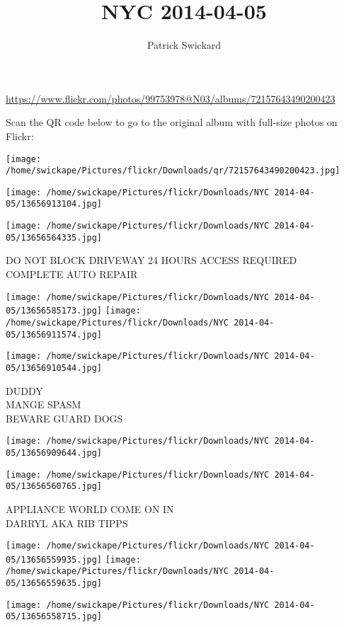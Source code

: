 \documentclass[10pt,letterpaper]{article}
\title{NYC 2014-04-05}
\author{Patrick Swickard}
\date{}
\begin{document}
\maketitle

\url{https://www.flickr.com/photos/99753978@N03/albums/72157643490200423}

Scan the QR code below to go to the original album with full-size photos on Flickr:

\texttt{[image: /home/swickape/Pictures/flickr/Downloads/qr/72157643490200423.jpg]}
\pagebreak

\texttt{[image: /home/swickape/Pictures/flickr/Downloads/NYC 2014-04-05/13656913104.jpg]}

\vspace{0.25in}
\texttt{[image: /home/swickape/Pictures/flickr/Downloads/NYC 2014-04-05/13656564335.jpg]}

DO NOT BLOCK DRIVEWAY 24 HOURS ACCESS REQUIRED\\
COMPLETE AUTO REPAIR
\pagebreak

\texttt{[image: /home/swickape/Pictures/flickr/Downloads/NYC 2014-04-05/13656585173.jpg]}
\texttt{[image: /home/swickape/Pictures/flickr/Downloads/NYC 2014-04-05/13656911574.jpg]}

\vspace{0.25in}
\texttt{[image: /home/swickape/Pictures/flickr/Downloads/NYC 2014-04-05/13656910544.jpg]}

DUDDY\\
MANGE SPASM\\
BEWARE GUARD DOGS
\pagebreak

\texttt{[image: /home/swickape/Pictures/flickr/Downloads/NYC 2014-04-05/13656909644.jpg]}

\vspace{0.25in}
\texttt{[image: /home/swickape/Pictures/flickr/Downloads/NYC 2014-04-05/13656560765.jpg]}

APPLIANCE WORLD COME ON IN\\
DARRYL AKA RIB TIPPS
\pagebreak

\texttt{[image: /home/swickape/Pictures/flickr/Downloads/NYC 2014-04-05/13656559935.jpg]}
\texttt{[image: /home/swickape/Pictures/flickr/Downloads/NYC 2014-04-05/13656559635.jpg]}

\vspace{0.25in}
\texttt{[image: /home/swickape/Pictures/flickr/Downloads/NYC 2014-04-05/13656558715.jpg]}
\end{document}
